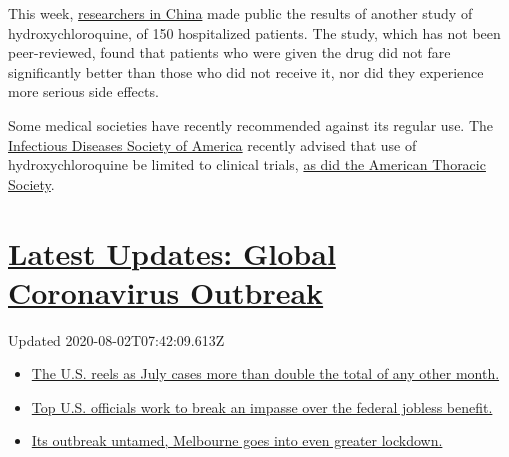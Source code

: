 This week,
\href{https://www.medrxiv.org/content/10.1101/2020.04.10.20060558v1}{researchers
in China} made public the results of another study of
hydroxychloroquine, of 150 hospitalized patients. The study, which has
not been peer-reviewed, found that patients who were given the drug did
not fare significantly better than those who did not receive it, nor did
they experience more serious side effects.

Some medical societies have recently recommended against its regular
use. The
\href{https://www.idsociety.org/practice-guideline/covid-19-guideline-treatment-and-management/}{Infectious
Diseases Society of America} recently advised that use of
hydroxychloroquine be limited to clinical trials,
\href{https://www.thoracic.org/about/newsroom/press-releases/journal/2020/ats-publishes-new-guidance-on-covid-19-management.php}{as
did the American Thoracic Society}.

\hypertarget{latest-updates-global-coronavirus-outbreak}{%
\section{\texorpdfstring{\href{https://www.nytimes3xbfgragh.onion/2020/08/01/world/coronavirus-covid-19.html?action=click\&pgtype=Article\&state=default\&region=MAIN_CONTENT_1\&context=storylines_live_updates}{Latest
Updates: Global Coronavirus
Outbreak}}{Latest Updates: Global Coronavirus Outbreak}}\label{latest-updates-global-coronavirus-outbreak}}

Updated 2020-08-02T07:42:09.613Z

\begin{itemize}
\tightlist
\item
  \href{https://www.nytimes3xbfgragh.onion/2020/08/01/world/coronavirus-covid-19.html?action=click\&pgtype=Article\&state=default\&region=MAIN_CONTENT_1\&context=storylines_live_updates\#link-34047410}{The
  U.S. reels as July cases more than double the total of any other
  month.}
\item
  \href{https://www.nytimes3xbfgragh.onion/2020/08/01/world/coronavirus-covid-19.html?action=click\&pgtype=Article\&state=default\&region=MAIN_CONTENT_1\&context=storylines_live_updates\#link-780ec966}{Top
  U.S. officials work to break an impasse over the federal jobless
  benefit.}
\item
  \href{https://www.nytimes3xbfgragh.onion/2020/08/01/world/coronavirus-covid-19.html?action=click\&pgtype=Article\&state=default\&region=MAIN_CONTENT_1\&context=storylines_live_updates\#link-2bc8948}{Its
  outbreak untamed, Melbourne goes into even greater lockdown.}
\end{itemize}

